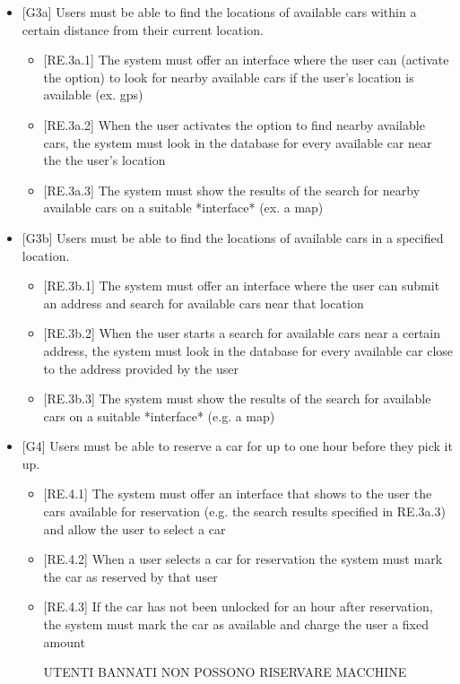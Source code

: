 \documentclass[english]{article}
\begin{document}
\begin{itemize}
\item{[G3a] Users must be able to find the locations of available cars within a certain distance from their current location.
\begin{itemize}
	\item{[RE.3a.1] The system must offer an interface where the user can (activate the option) to look for nearby available cars if the user’s location is available (ex. gps)}
	\item{[RE.3a.2] When the user activates the option to find nearby available cars, the system must look in the database for every available car near the the user’s location}
	\item{[RE.3a.3] The system must show the results of the search for nearby available cars on a suitable *interface* (ex. a map)}
\end{itemize}
}

\item{[G3b] Users must be able to find the locations of available cars in a specified location.
\begin{itemize}
	\item{[RE.3b.1] The system must offer an interface where the user can submit an address and search for available cars near that location}
	\item{[RE.3b.2] When the user starts a search for available cars near a certain address, the system must look in the database for every available car close to the address provided by the user}
	\item{[RE.3b.3] The system must show the results of the search for available cars on a suitable *interface* (e.g. a map)}
\end{itemize}
}

\item{[G4] Users must be able to reserve a car for up to one hour before they pick it up.
\begin{itemize}
	\item{[RE.4.1] The system must offer an interface that shows to the user the cars available for reservation (e.g. the search results specified in RE.3a.3) and allow the user to select a car}
	\item{[RE.4.2] When a user selects a car for reservation the system must mark the car as reserved by that user}
	\item{[RE.4.3] If the car has not been unlocked for an hour after reservation, the system must mark the car as available and charge the user a fixed amount}
	
UTENTI BANNATI NON POSSONO RISERVARE MACCHINE


\end{itemize}}
\end{itemize}
\end{document}
